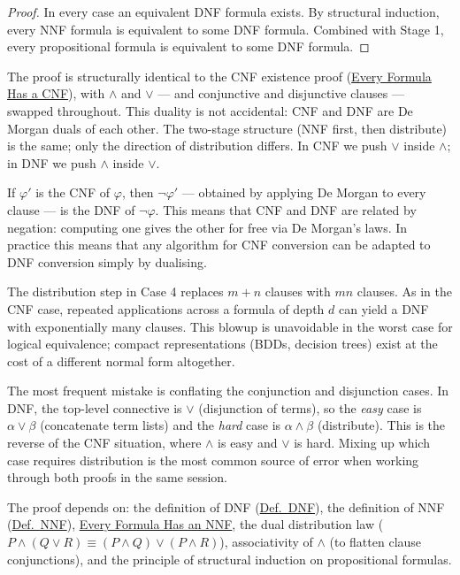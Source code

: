 \begin{proof}
\medskip
In every case an equivalent DNF formula exists. By structural induction, every
NNF formula is equivalent to some DNF formula. Combined with Stage 1, every
propositional formula is equivalent to some DNF formula. \AsReq
\end{proof}

\begin{remark*}
The proof is structurally identical to the CNF existence proof
(\hyperref[prf:cnf-exists]{Every Formula Has a CNF}), with $\wedge$ and $\vee$
— and conjunctive and disjunctive clauses — swapped throughout. This
duality is not accidental: CNF and DNF are De Morgan duals of each other.
The two-stage structure (NNF first, then distribute) is the same; only the
direction of distribution differs. In CNF we push $\vee$ inside $\wedge$; in
DNF we push $\wedge$ inside $\vee$.
\end{remark*}

\begin{remark*}
If $\varphi'$ is the CNF of $\varphi$, then $\neg\varphi'$ — obtained by
applying De Morgan to every clause — is the DNF of $\neg\varphi$. This means
that CNF and DNF are related by negation: computing one gives the other for
free via De Morgan's laws. In practice this means that any algorithm for CNF
conversion can be adapted to DNF conversion simply by dualising.
\end{remark*}

\begin{remark*}
The distribution step in Case 4 replaces $m + n$ clauses with $mn$ clauses.
As in the CNF case, repeated applications across a formula of depth $d$ can
yield a DNF with exponentially many clauses. This blowup is unavoidable in the
worst case for logical equivalence; compact representations (BDDs, decision
trees) exist at the cost of a different normal form altogether.
\end{remark*}

\begin{remark*}
The most frequent mistake is conflating the conjunction and disjunction cases.
In DNF, the top-level connective is $\vee$ (disjunction of terms), so the
\emph{easy} case is $\alpha \vee \beta$ (concatenate term lists) and the
\emph{hard} case is $\alpha \wedge \beta$ (distribute). This is the reverse of
the CNF situation, where $\wedge$ is easy and $\vee$ is hard. Mixing up which
case requires distribution is the most common source of error when working
through both proofs in the same session.
\end{remark*}

\begin{remark*}[Dependencies]
The proof depends on: the definition of DNF (\hyperref[def:dnf]{Def.\ DNF}),
the definition of NNF (\hyperref[def:nnf]{Def.\ NNF}),
\hyperref[prop:nnf-exists]{Every Formula Has an NNF},
the dual distribution law ($P \wedge (Q \vee R) \equiv (P \wedge Q) \vee (P
\wedge R)$), associativity of $\wedge$ (to flatten clause conjunctions), and
the principle of structural induction on propositional formulas.
\end{remark*}
